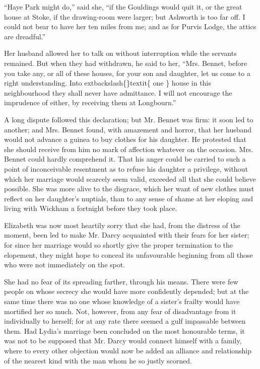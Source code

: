 \documentclass[10pt]{book}
\begin{document}
   “Haye Park might do,” said she, “if the Gouldings would quit it, or the
great house at Stoke, if the drawing-room were larger; but Ashworth is
too far off. I could not bear to have her ten miles from me; and as for
Purvis Lodge, the attics are dreadful.”
  

   Her husband allowed her to talk on without interruption while the
servants remained. But when they had withdrawn, he said to her, “Mrs.
Bennet, before you take any, or all of these houses, for your son and
daughter, let us come to a right understanding. Into
   	extbackslash\{\}textit\{
    one
   \}
   house in this
neighbourhood they shall never have admittance. I will not encourage the
imprudence of either, by receiving them at Longbourn.”
  

   A long dispute followed this declaration; but Mr. Bennet was firm: it
soon led to another; and Mrs. Bennet found, with amazement and horror,
that her husband would not advance a guinea to buy clothes for his
daughter. He protested that she should receive from him no mark of
affection whatever on the occasion. Mrs. Bennet could hardly comprehend
it. That his anger could be carried to such a point of inconceivable
resentment as to refuse his daughter a privilege, without which her
marriage would scarcely seem valid, exceeded all that she could believe
possible. She was more alive to the
   disgrace, which her want of new
clothes must reflect on her daughter’s nuptials, than to any sense of
shame at her eloping and living with Wickham a fortnight before they
took place.
  

   Elizabeth was now most heartily sorry that she had, from the distress of
the moment, been led to make Mr. Darcy acquainted with their fears for
her sister; for since her marriage would so shortly give the proper
termination to the elopement, they might hope to conceal its
unfavourable beginning from all those who were not immediately on the
spot.
  

   She had no fear of its spreading farther, through his means. There were
few people on whose secrecy she would have more confidently depended;
but at the same time there was no one whose knowledge of a sister’s
frailty would have mortified her so much. Not, however, from any fear of
disadvantage from it individually to herself; for at any rate there
seemed a gulf impassable between them. Had Lydia’s marriage been
concluded on the most honourable terms, it was not to be supposed that
Mr. Darcy would connect himself with a family, where to every other
objection would now be added an alliance and relationship of the nearest
kind with the man whom he so justly scorned.
  
\end{document}
